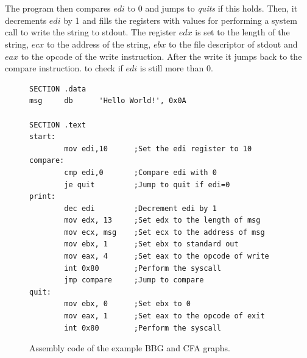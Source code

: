 \documentclass{kththesis}
\renewcommand{\it}[1]{\textit{#1}}
\begin{document}
\\ \\
The program then compares $edi$ to 0 and jumps to \it{quits} if this holds. Then, it decrements $edi$ by 1 and fills the registers with values for performing a system call to write the string to stdout. The register $edx$ is set to the length of the string, $ecx$ to the address of the string, $ebx$ to the file descriptor of stdout and $eax$ to the opcode of the write instruction. After the write it jumps back to the compare instruction. to check if $edi$ is still more than 0. 
\begin{figure}[t]
    \centering
\begin{tcolorbox}
\begin{verbatim}
SECTION .data
msg     db      'Hello World!', 0x0A

SECTION .text
start:
        mov edi,10      ;Set the edi register to 10
compare:
        cmp edi,0       ;Compare edi with 0
        je quit         ;Jump to quit if edi=0
print:
        dec edi         ;Decrement edi by 1
        mov edx, 13     ;Set edx to the length of msg
        mov ecx, msg    ;Set ecx to the address of msg
        mov ebx, 1      ;Set ebx to standard out
        mov eax, 4      ;Set eax to the opcode of write
        int 0x80        ;Perform the syscall
        jmp compare     ;Jump to compare
quit:
        mov ebx, 0      ;Set ebx to 0
        mov eax, 1      ;Set eax to the opcode of exit
        int 0x80        ;Perform the syscall
\end{verbatim}
\end{tcolorbox}
\clearpage
\caption[Assembly code of the example BBG and CFA graphs.]{Assembly code of the example BBG and CFA graphs.}
    \label{fig:assembly}
\end{figure}
\end{document}
